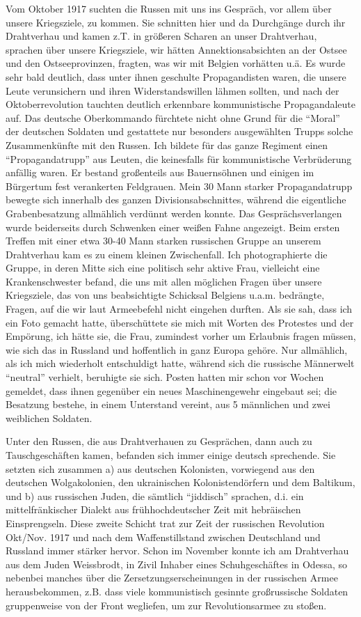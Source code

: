 \documentclass[a5paper,pagesize,10pt,twoside=true]{scrbook}
\renewcommand{\marginpar}[2][]{}
\begin{document}
Vom Oktober 1917 suchten die Russen mit uns ins Gespräch, vor allem über unsere Kriegsziele, zu kommen. Sie schnitten hier und da Durchgänge durch ihr Drahtverhau und kamen z.T. in größeren Scharen an unser Drahtverhau, sprachen über unsere Kriegsziele, wir hätten Annektionsabsichten an der Ostsee und den Ostseeprovinzen, fragten, was wir mit Belgien vorhätten u.ä. Es wurde sehr bald deutlich, dass unter ihnen geschulte Propagandisten waren, die unsere Leute verunsichern und ihren Widerstandswillen lähmen sollten, und nach der Oktoberrevolution tauchten deutlich erkennbare kommunistische Propagandaleute auf. Das deutsche Oberkommando fürchtete nicht ohne Grund für die \enquote{Moral} der deutschen Soldaten und gestattete nur besonders ausgewählten Trupps solche Zusammenkünfte mit den Russen. Ich bildete für das ganze Regiment einen \enquote{Propagandatrupp} aus Leuten, die keinesfalls für kommunistische Verbrüderung anfällig waren. Er bestand großenteils aus Bauernsöhnen und einigen im Bürgertum fest verankerten Feldgrauen. Mein 30 Mann starker Propagandatrupp bewegte sich innerhalb des ganzen Divisionsabschnittes, während die eigentliche Grabenbesatzung allmählich verdünnt werden konnte. Das Gesprächsverlangen wurde beiderseits durch Schwenken einer weißen Fahne angezeigt. Beim ersten Treffen mit einer etwa 30-40 Mann starken russischen Gruppe an unserem Drahtverhau kam es zu einem kleinen Zwischenfall. Ich photographierte die Gruppe, in deren Mitte sich eine politisch sehr aktive Frau, vielleicht eine Krankenschwester befand, die uns mit allen möglichen Fragen über unsere Kriegsziele, das von uns beabsichtigte Schicksal Belgiens u.a.m. bedrängte, Fragen, auf die wir laut Armeebefehl nicht eingehen durften. Als sie sah, dass ich ein Foto gemacht hatte, überschüttete sie mich mit Worten des Protestes und der Empörung, ich hätte sie, die Frau, zumindest vorher um Erlaubnis fragen müssen, wie sich das in Russland und hoffentlich in ganz Europa gehöre. Nur allmählich, als ich mich wiederholt entschuldigt hatte, während sich die russische \marginpar{315} Männerwelt \enquote{neutral} verhielt, beruhigte sie sich. Posten hatten mir schon vor Wochen gemeldet, dass ihnen gegenüber ein neues Maschinengewehr eingebaut sei; die Besatzung bestehe, in einem Unterstand vereint, aus 5 männlichen und zwei weiblichen Soldaten.

Unter den Russen, die aus Drahtverhauen zu Gesprächen, dann auch zu Tauschgeschäften kamen, befanden sich immer einige deutsch sprechende. Sie setzten sich zusammen a) aus deutschen Kolonisten, vorwiegend aus den deutschen Wolgakolonien, den ukrainischen Kolonistendörfern und dem Baltikum, und b) aus russischen Juden, die sämtlich \enquote{jiddisch} sprachen, d.i. ein mittelfränkischer Dialekt aus frühhochdeutscher Zeit mit hebräischen Einsprengseln. Diese zweite Schicht trat zur Zeit der russischen Revolution Okt/Nov. 1917 und nach dem Waffenstillstand zwischen Deutschland und Russland immer stärker hervor. Schon im November konnte ich am Drahtverhau aus dem Juden Weissbrodt, in Zivil Inhaber eines Schuhgeschäftes in Odessa, so nebenbei manches über die Zersetzungserscheinungen in der russischen Armee herausbekommen, z.B. dass viele kommunistisch gesinnte großrussische Soldaten gruppenweise von der Front wegliefen, um zur Revolutionsarmee zu stoßen.
\end{document}
